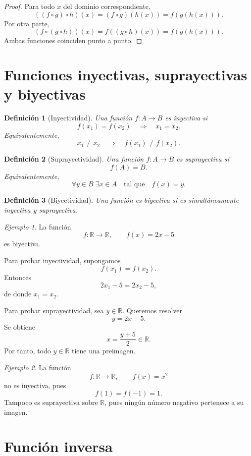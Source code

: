 \documentclass[12pt]{article}
\newtheorem{definicion}{Definición}[section]
\theoremstyle{remark}
\newtheorem{ejemplo}{Ejemplo}[section]
\newcommand{\R}{\mathbb{R}}
\begin{document}
\begin{proof}
Para todo $x$ del dominio correspondiente,
\[
((f\circ g)\circ h)(x)
=(f\circ g)(h(x))
=f(g(h(x))).
\]
Por otra parte,
\[
(f\circ(g\circ h))(x)
=f((g\circ h)(x))
=f(g(h(x))).
\]
Ambas funciones coinciden punto a punto.
\end{proof}

\section{Funciones inyectivas, suprayectivas y biyectivas}

\begin{definicion}[Inyectividad]
Una función $f:A\to B$ es inyectiva si
\[
f(x_1)=f(x_2)\quad\Longrightarrow\quad x_1=x_2.
\]
Equivalentemente,
\[
x_1\neq x_2\quad\Longrightarrow\quad f(x_1)\neq f(x_2).
\]
\end{definicion}

\begin{definicion}[Suprayectividad]
Una función $f:A\to B$ es suprayectiva si
\[
f(A)=B.
\]
Equivalentemente,
\[
\forall y\in B\;\exists x\in A
\quad\text{tal que}\quad
f(x)=y.
\]
\end{definicion}

\begin{definicion}[Biyectividad]
Una función es biyectiva si es simultáneamente inyectiva y suprayectiva.
\end{definicion}

\begin{ejemplo}
La función
\[
f:\R\to\R,\qquad f(x)=2x-5
\]
es biyectiva.

Para probar inyectividad, supongamos
\[
f(x_1)=f(x_2).
\]
Entonces
\[
2x_1-5=2x_2-5,
\]
de donde $x_1=x_2$.

Para probar suprayectividad, sea $y\in\R$. Queremos resolver
\[
y=2x-5.
\]
Se obtiene
\[
x=\frac{y+5}{2}\in\R.
\]
Por tanto, todo $y\in\R$ tiene una preimagen.
\end{ejemplo}

\begin{ejemplo}
La función
\[
f:\R\to\R,\qquad f(x)=x^2
\]
no es inyectiva, pues
\[
f(1)=f(-1)=1.
\]
Tampoco es suprayectiva sobre $\R$, pues ningún número negativo pertenece a su
imagen.
\end{ejemplo}

\section{Función inversa}
\end{document}
